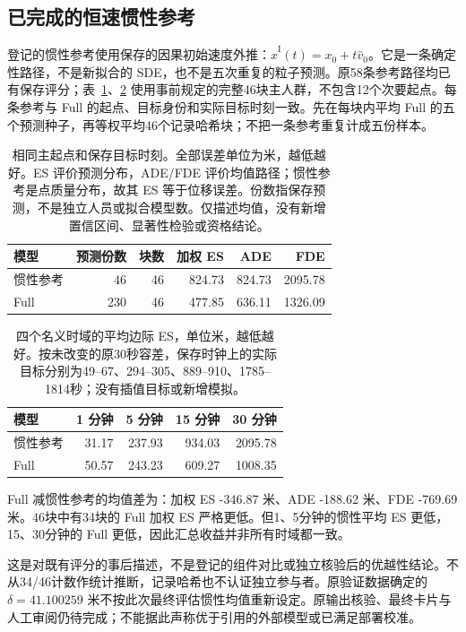 \FloatBarrier
\subsection{已完成的恒速惯性参考}
\label{sec:inertial-primary}
登记的惯性参考使用保存的因果初始速度外推：$\widehat x^{\mathrm{I}}(t)=x_0+t\widehat v_0$。它是一条确定性路径，不是新拟合的 SDE，也不是五次重复的粒子预测。原58条参考路径均已有保存评分；表~\ref{tab:inertial-primary}、\ref{tab:inertial-horizons} 使用事前规定的完整46块主人群，不包含12个次要起点。每条参考与 Full 的起点、目标身份和实际目标时刻一致。先在每块内平均 Full 的五个预测种子，再等权平均46个记录哈希块；不把一条参考重复计成五份样本。

\begin{table}[htbp]\centering\small
\caption{相同主起点和保存目标时刻。全部误差单位为米，越低越好。ES 评价预测分布，ADE/FDE 评价均值路径；惯性参考是点质量分布，故其 ES 等于位移误差。份数指保存预测，不是独立人员或拟合模型数。仅描述均值，没有新增置信区间、显著性检验或资格结论。}\label{tab:inertial-primary}
\begin{tabular}{@{}lrrrrr@{}}\toprule
模型 & 预测份数 & 块数 & 加权 ES & ADE & FDE\\\midrule
惯性参考 & 46 & 46 & 824.73 & 824.73 & 2095.78\\
Full & 230 & 46 & 477.85 & 636.11 & 1326.09\\
\bottomrule\end{tabular}\end{table}

\begin{table}[htbp]\centering\small
\caption{四个名义时域的平均边际 ES，单位米，越低越好。按未改变的原30秒容差，保存时钟上的实际目标分别为49--67、294--305、889--910、1785--1814秒；没有插值目标或新增模拟。}\label{tab:inertial-horizons}
\begin{tabular}{@{}lrrrr@{}}\toprule
模型 & 1 分钟 & 5 分钟 & 15 分钟 & 30 分钟\\\midrule
惯性参考 & 31.17 & 237.93 & 934.03 & 2095.78\\
Full & 50.57 & 243.23 & 609.27 & 1008.35\\
\bottomrule\end{tabular}\end{table}

Full 减惯性参考的均值差为：加权 ES -346.87 米、ADE -188.62 米、FDE -769.69 米。46块中有34块的 Full 加权 ES 严格更低。但1、5分钟的惯性平均 ES 更低，15、30分钟的 Full 更低，因此汇总收益并非所有时域都一致。

这是对既有评分的事后描述，不是登记的组件对比或独立核验后的优越性结论。不从34/46计数作统计推断，记录哈希也不认证独立参与者。原验证数据确定的 $\delta=41.100259$ 米不按此次最终评估惯性均值重新设定。原输出核验、最终卡片与人工审阅仍待完成；不能据此声称优于引用的外部模型或已满足部署校准。
\FloatBarrier
